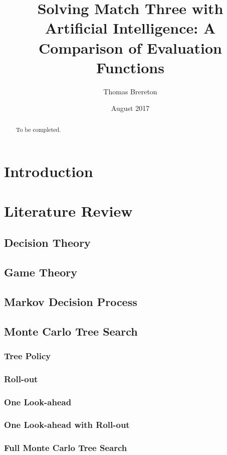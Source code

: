 \documentclass{bhamthesis}
\title{Solving Match Three with Artificial Intelligence: A Comparison of Evaluation Functions}
\author{Thomas Brereton}
\date{August 2017}  %
\makeatletter
\theoremstyle{definition}
\newcommand{\makecrestcover}{%
\begin{titlepage}
\centering\singlespacing
\vspace*{1cm}
{\huge\bfseries University of Birmingham\par}
\vspace*{2cm}
\texttt{[image: crest]}\par
\vspace*{\stretch{1}}
{\Huge\bfseries
\@author\par
\vspace{1cm}
\@title\par}
\vspace*{\stretch{1}}
{\Large\@date\par}
\end{titlepage}
}
\makeatother
\begin{document}
\frontmatter

\maketitle


\begin{abstract}
To be completed.
\end{abstract}

\tableofcontents


\mainmatter
\chapter{Introduction}
\blindtext

\chapter{Literature Review}
\section{Decision Theory}
\section{Game Theory}
\section{Markov Decision Process}
\section{Monte Carlo Tree Search}
\subsection{Tree Policy}
\subsection{Roll-out}
\subsection{One Look-ahead}
\subsection{One Look-ahead with Roll-out}
\subsection{Full Monte Carlo Tree Search}
\end{document}
